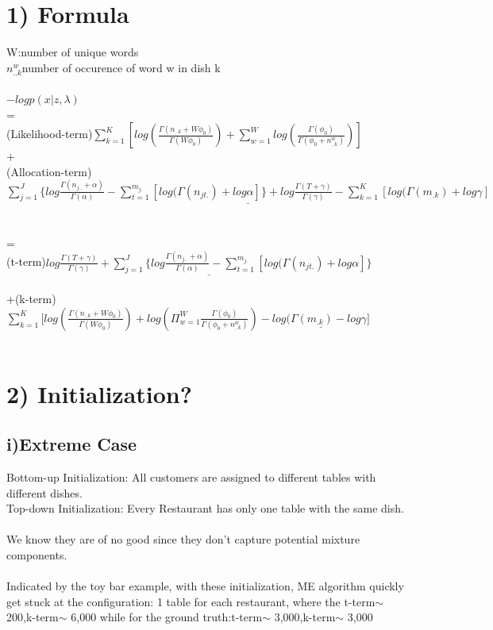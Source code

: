 \documentclass{article}
\begin{document}
\begin{spacing}{1.1}
\section{1) Formula}
W:number of unique words\\ 
$n_{..k}^{w}$number of occurence of word w in dish k \\ \\
$-log p(x|z,\lambda)$\\ =\\
(Likelihood-term)$ \sum_{k=1}^{K} [log(\frac{\Gamma(n_{..k}+W\phi_{0})}{\Gamma(W\phi_{0})})+\sum_{w=1}^{W}log(\frac{\Gamma(\phi_{0})}{\Gamma(\phi_{0}+n_{..k}^{w})})]$
\\
+
\\
(Allocation-term)$\underline{\sum_{j=1}^{J}\{log \frac{\Gamma(n_{j..}+\alpha)}{\Gamma(\alpha)}-\sum_{t=1}^{m_{j.}}[log(\Gamma(n_{jt.})+log \alpha]\}+
 log \frac{\Gamma(T+\gamma)}{\Gamma(\gamma)}-\sum_{k=1}^{K} [log(\Gamma(m_{.k})+log \gamma]}$
\\ \\ \\
=\\
(t-term)$ \underline{log \frac{\Gamma(T+\gamma)}{\Gamma(\gamma)}+\sum_{j=1}^{J} \{log \frac{\Gamma(n_{j..}+\alpha)}{\Gamma(\alpha)}-\sum_{t=1}^{m_{j.}}[log(\Gamma(n_{jt.})+log \alpha
]\}}$\\ \\
+(k-term)$ \sum_{k=1}^{K} [log(\frac{\Gamma(n_{..k}+W\phi_{0})}{\Gamma(W\phi_{0})})+log(\Pi_{w=1}^{W}\frac{\Gamma(\phi_{0})}{\Gamma(\phi_{0}+n_{..k}^{w})})
-\underline{log(\Gamma(m_{.k})-log \gamma]}$\\ \\ 


\section{2) Initialization?}

\subsection{i)Extreme Case}
Bottom-up Initialization: All customers are assigned to different tables with different dishes.\\
Top-down Initialization: Every Restaurant has only one table with the same dish.\\ \\
We know they are of no good since they don't capture potential mixture components.\\ \\
Indicated by the toy bar example, with these initialization, ME algorithm quickly get stuck at the configuration: 1 table for each restaurant,
where the t-term$\sim$ 200,k-term$\sim$ 6,000 while for the ground truth:t-term$\sim$ 3,000,k-term$\sim$ 3,000

\end{spacing}
\end{document}

